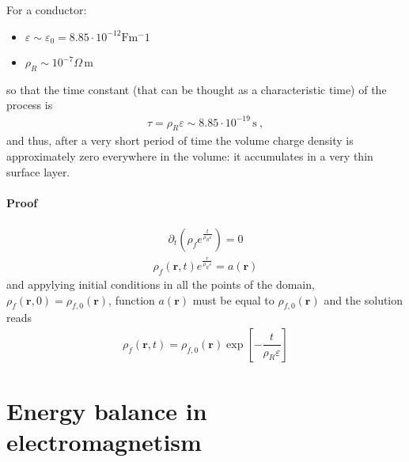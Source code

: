 \documentclass[letterpaper,10pt,italian]{jupyterBook}
\begin{document}
\sphinxAtStartPar
For a conductor:
\begin{itemize}
\item {} 
\sphinxAtStartPar
\(\varepsilon \sim \varepsilon_0 = 8.85 \cdot 10^{-12} \text{F} \text{m}^-1\)

\item {} 
\sphinxAtStartPar
\(\rho_R \sim 10^{-7}  \Omega \, \text{m}\)

\end{itemize}

\sphinxAtStartPar
so that the time constant (that can be thought as a characteristic time) of the process is
\begin{equation*}
\begin{split}\tau = \rho_R \varepsilon \sim 8.85 \cdot 10^{-19} \, \text{s} \ , \end{split}
\end{equation*}
\sphinxAtStartPar
and thus, after a very short period of time the volume charge density is approximately zero everywhere in the volume: it accumulates in a very thin surface layer.
\subsubsection*{Proof}
\begin{equation*}
\begin{split}\partial_t \left( \rho_f e^{\frac{t}{\rho_R \varepsilon}} \right) = 0\end{split}
\end{equation*}\begin{equation*}
\begin{split}\rho_f(\mathbf{r},t) e^{\frac{r}{\rho_R \varepsilon}} = a(\mathbf{r})\end{split}
\end{equation*}
\sphinxAtStartPar
and appylying initial conditions in all the points of the domain, \(\rho_{f}(\mathbf{r},0) = \rho_{f,0}(\mathbf{r})\), function \(a(\mathbf{r})\) must be equal to \(\rho_{f,0}(\mathbf{r})\) and the solution reads
\begin{equation*}
\begin{split}\rho_f(\mathbf{r},t) = \rho_{f,0}(\mathbf{r}) \exp \left[ -\dfrac{t}{\rho_R \varepsilon} \right]\end{split}
\end{equation*}
\sphinxstepscope




\chapter{Energy balance in electromagnetism}
\label{\detokenize{ch/energy:energy-balance-in-electromagnetism}}\label{\detokenize{ch/energy:classical-electromagnetism-energy}}\label{\detokenize{ch/energy::doc}}
\end{document}
